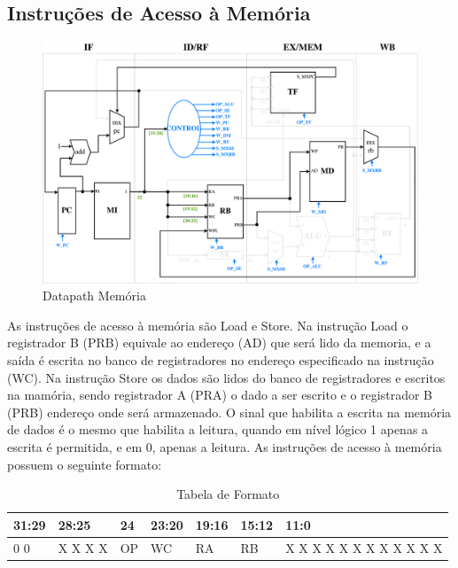 \documentclass{report}
\begin{document}
\subsection{Instruções de Acesso à Memória}
\begin{figure}[H]
\centering
\includegraphics[width=\textwidth]{./pictures/DatapathMEM.pdf}
\caption{Datapath Memória}
\end{figure}


As instruções de acesso à memória são Load e Store. Na instrução Load o registrador B (PRB) equivale ao endereço (AD) que será lido da memoria, e a saída é escrita no banco de registradores no endereço especificado na instrução (WC). Na instrução Store os dados são lidos do banco de registradores e escritos na mamória, sendo registrador A (PRA) o dado a ser escrito e o registrador B (PRB) endereço onde será armazenado. \newline
O sinal que habilita a escrita na memória de dados é o mesmo que habilita a leitura, quando em nível lógico 1 apenas a escrita é permitida, e em 0, apenas a leitura.
\newline \newline
As instruções de acesso à memória possuem o seguinte formato:

\FloatBarrier
\begin{table}[H]
  \begin{center}
  \renewcommand{\arraystretch}{1.2}
    \begin{tabular}[pos]{|>{\centering\arraybackslash}m{32pt}|>{\centering\arraybackslash}m{42pt}|>{\centering\arraybackslash}m{23pt}|>{\centering\arraybackslash}m{42pt}|>{\centering\arraybackslash}m{32pt}|>{\centering\arraybackslash}m{42pt}|>{\centering\arraybackslash}m{127pt}|} \hline
      \cellcolor[gray]{0.9}\textbf{31:29} & \cellcolor[gray]{0.9}\textbf{28:25} & \cellcolor[gray]{0.9}\textbf{24} & \cellcolor[gray]{0.9}\textbf{23:20} & \cellcolor[gray]{0.9}\textbf{19:16} & \cellcolor[gray]{0.9}\textbf{15:12} & \cellcolor[gray]{0.9}\textbf{11:0} \\ \hline
      1 0 0         & X X X X       & OP        & WC        & RA        & RB        & X X X X X X X X X X X X \\ \hline
    \end{tabular}
    \caption{Tabela de Formato}
    \end{center}
\end{table}  
\end{document}
